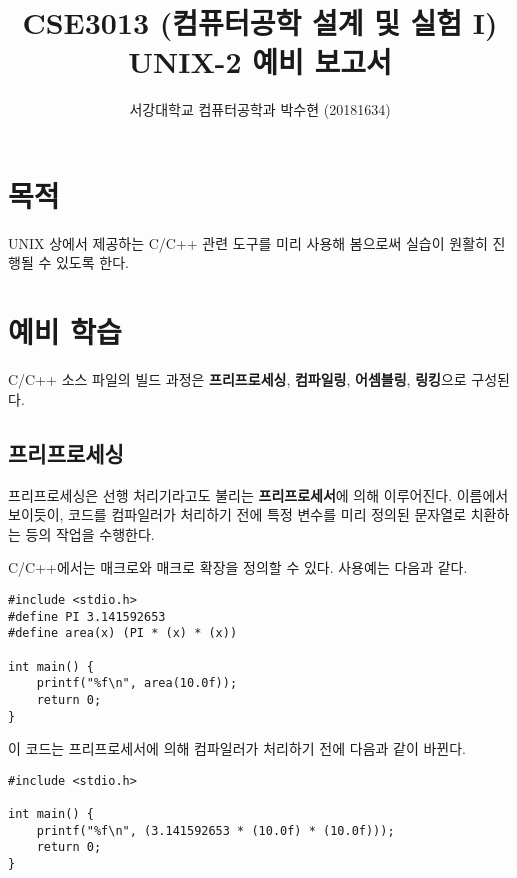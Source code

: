 
	


\title{CSE3013 (컴퓨터공학 설계 및 실험 I) \space \newline UNIX-2 예비 보고서}
\author{서강대학교 컴퓨터공학과 박수현 (20181634)}
\maketitle

\section{목적}
UNIX 상에서 제공하는 C/C++ 관련 도구를 미리 사용해 봄으로써 실습이 원활히 진행될 수 있도록 한다.

\section{예비 학습}
C/C++ 소스 파일의 빌드 과정은 \textbf{프리프로세싱}, \textbf{컴파일링}, \textbf{어셈블링}, \textbf{링킹}으로 구성된다.

\subsection{프리프로세싱}
프리프로세싱은 선행 처리기라고도 불리는 \textbf{프리프로세서}에 의해 이루어진다. 이름에서 보이듯이, 코드를 컴파일러가 처리하기 전에 특정 변수를 미리 정의된 문자열로 치환하는 등의 작업을 수행한다.

C/C++에서는 매크로와 매크로 확장을 정의할 수 있다. 사용예는 다음과 같다.

\begin{verbatim}
#include <stdio.h>
#define PI 3.141592653
#define area(x) (PI * (x) * (x))

int main() {
    printf("%f\n", area(10.0f));
    return 0;
}
\end{verbatim}

이 코드는 프리프로세서에 의해 컴파일러가 처리하기 전에 다음과 같이 바뀐다.

\begin{verbatim}
#include <stdio.h>

int main() {
    printf("%f\n", (3.141592653 * (10.0f) * (10.0f)));
    return 0;
}
\end{verbatim}

